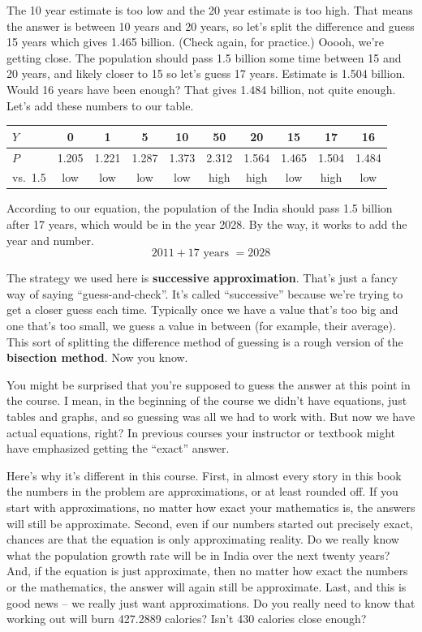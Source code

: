 The 10 year estimate is too low and the 20 year estimate is too high.  That means the answer is between 10 years and 20 years, so let's split the difference and guess 15 years which gives 1.465 billion.  (Check again, for practice.)  Ooooh, we're getting close.  The population should pass 1.5 billion some time between 15 and 20 years, and likely closer to 15 so let's guess 17 years.  Estimate is  1.504 billion.  Would 16 years have been enough?  That gives 1.484 billion, not quite enough.  Let's add these numbers to our table.

\begin{center}
\begin{tabular} {|l| |c |c |c |c |c |c |c |c  |c|}\hline
$Y$ & 0 & 1 & 5 & 10 & 50 & 20 & 15 & 17& 16 \\ \hline
$P$ & 1.205 & 1.221 &1.287  & 1.373 & 2.312 & 1.564 & 1.465 &1.504  & 1.484  \\ \hline
vs.\ 1.5 & low & low & low & low & high & high & low & high & low \\ \hline
\end{tabular}
\end{center}

According to our equation, the population of the India should pass 1.5 billion after 17 years, which would be in the year 2028.  By the way,  it works to add the year and number. $$2011 + 17 \text{ years } = 2028$$

The strategy we used here is  \textbf{successive approximation}.  That's just a fancy way of saying ``guess-and-check''.  It's called ``successive'' because we're trying to get a closer guess each time.  Typically once we have a value that's too big and one that's too small, we guess a value in between (for example, their average).  This sort of splitting the difference method of guessing is a rough version of the \textbf{bisection method}.  Now you know.

You might be surprised that you're supposed to guess the answer at this point in the course. I mean, in the beginning of the course we didn't have equations, just tables and graphs, and so guessing was all we had to work with.  But now we have actual equations, right?  In previous courses your instructor or textbook might have emphasized getting the ``exact'' answer.  

Here's why it's different in this course.  First, in almost every story in this book the numbers in the problem are approximations, or at least rounded off.  If you start with approximations, no matter how exact your mathematics is, the answers will still be approximate.  Second, even if our numbers started out precisely exact, chances are that the equation is only approximating reality.  Do we really know what the population growth rate will be in India over the next twenty years? And, if the equation is just approximate, then no matter how exact the numbers or the mathematics, the answer will again still be approximate. Last, and this is good news -- we really just want approximations.  Do you really need to know that working out will burn 427.2889 calories?  Isn't 430 calories close enough?

